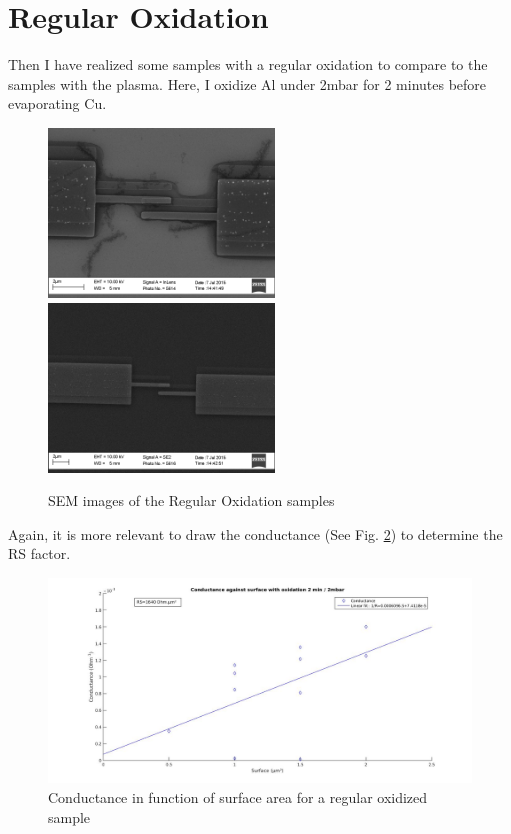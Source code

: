                 \section{Regular Oxidation}
                
                Then I have realized some samples with a regular oxidation to compare to the samples with the plasma. Here, I oxidize Al under 2mbar for 2 minutes before evaporating Cu.
                
                 \begin{figure}
                    \centering
                    \includegraphics[width=6cm]{SEMtest16_1.png}
                    \includegraphics[width=6cm]{SEMtest16_2.png}
                    \caption{SEM images of the Regular Oxidation samples}
                    \label{SEMregularox}
                \end{figure}
                
                Again, it is more relevant to draw the conductance (See Fig. \ref{Regularox}) to determine the RS factor.
                
                \begin{figure}
                    \centering
                    \includegraphics[width=12cm]{OxLinear.jpg}
                    \caption{Conductance in function of surface area for a regular oxidized sample}
                    \label{Regularox}
                \end{figure}
                                
